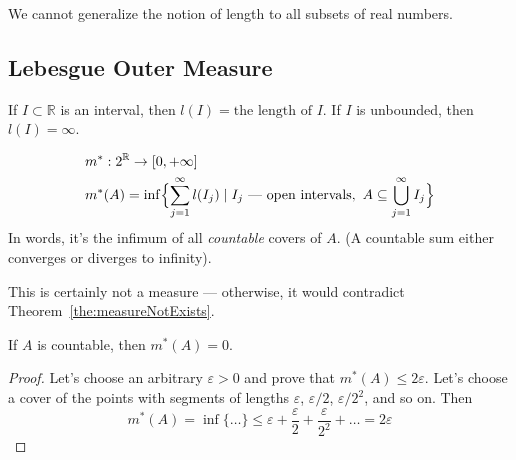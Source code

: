 \begin{consequence}
    We cannot generalize the notion of length to all subsets of real numbers.
\end{consequence}

\subsection{Lebesgue Outer Measure}
\begin{definition}
    \label{def:lebesgueOuterMeasure}
    If $I \subset \mathbb{R}$ is an interval, then
    $l(I) = \text{the length of $I$}$. If $I$ is unbounded, then $l(I) = \infty$.
\end{definition}
\begin{definition}
    \begin{align*}
        &
        m^* : 2^{\mathbb{R}} \to [0, +\infty]
        \\&
        m^*(A) = \inf \Bigl\{ \sum_{j = 1}^{\infty} l(I_j) \mid 
        I_j \text{ --- open intervals},\ A \subseteq \bigcup_{j=1}^{\infty} I_j\Bigr\}
    \end{align*}
    In words, it's the infimum of all \textit{countable} covers of $A$.
    (A countable sum either converges or diverges to infinity).
\end{definition}
\begin{remark}
    This is certainly not a measure --- otherwise, it would contradict Theorem~\ref{the:measureNotExists}.
\end{remark}

\begin{example}
    If $A$ is countable, then $m^*(A) = 0$.
\end{example}
\begin{proof}
    Let's choose an arbitrary $\varepsilon > 0$ and prove that $m^*(A) \le 2\varepsilon$.
    Let's choose a cover of the points with segments of lengths $\varepsilon$, $\varepsilon / 2$, $\varepsilon / 2^2$, and so on.
    Then \[
        m^*(A) = \inf \{\dots\} \le \varepsilon + \frac{\varepsilon}{2} + \frac{\varepsilon}{2^2} + \dots = 2\varepsilon
    \]
\end{proof}

